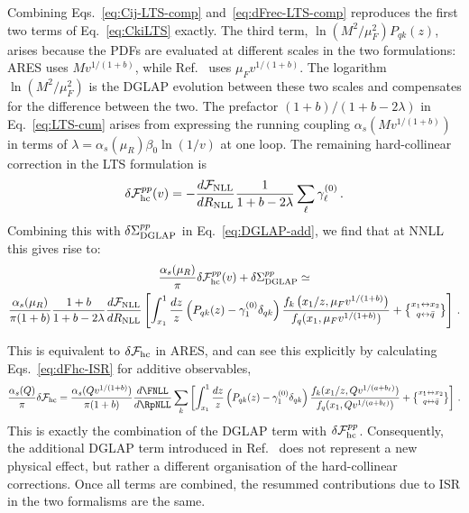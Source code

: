 Combining Eqs.~\eqref{eq:Cij-LTS-comp} and~\eqref{eq:dFrec-LTS-comp}
reproduces the first two terms of Eq.~\eqref{eq:CkiLTS} exactly. The
third term, $\ln(M^2/\mu_F^2)P_{qk}(z)$, arises because the PDFs are 
evaluated at different scales in the two formulations:
\textsc{ARES} uses $Mv^{1/(1+b)}$, while Ref.~\cite{vanBeekveld:2025zjh} uses $\mu_Fv^{1/(1+b)}$. The logarithm $\ln(M^2/\mu_F^2)$ is the 
DGLAP evolution between these two scales and compensates for the
difference between the two. The prefactor $(1+b)/(1+b-2\lambda)$ in Eq.~\eqref{eq:LTS-cum} arises from expressing the running coupling $\alpha_s(Mv^{1/(1+b)})$ in terms of $\lambda=\alpha_s(\mu_R)\beta_0\ln(1/v)$ at one loop. 
The remaining hard-collinear correction in the LTS formulation is
\begin{equation}
\label{eq:dFhc-LTS}
\delta\mathcal{F}^{pp}_{\mathrm{hc}}(v)
=-\frac{d\mathcal{F}_{\rm NLL}}{dR_{\rm NLL}}
\frac{1}{1+b-2\lambda}
\sum_{\ell}\gamma_\ell^{(0)}\,.
\end{equation}
Combining this with $\delta\Sigma^{pp}_{\rm DGLAP}$ in Eq.~\eqref{eq:DGLAP-add}, we find that at NNLL this gives rise to:
\begin{multline}
	\frac{\alpha_s(\mu_R)}{\pi}\delta\mathcal{F}^{pp}_{\mathrm{hc}}(v)+
	\delta\Sigma^{pp}_{\rm DGLAP}\simeq\\
	\frac{\alpha_s(\mu_R)}{\pi(1+b)}\frac{1+b}{1+b-2\lambda}\frac{d\mathcal{F}_{\rm NLL}}{dR_{\rm NLL}}\left[\int_{x_1}^1\frac{dz}{z}\left(P_{qk}(z)-\gamma^{(0)}_1\delta_{qk}\right)
\frac{f_k\left(x_1/z,\mu_F v^{1/(1+b)}\right)}{f_{ q}(x_{1},\mu_F v^{1/(1+b)})}
+ \left\{\substack{x_1\leftrightarrow x_2\\[0.5ex] q\leftrightarrow\bar{q}}\right\}
\right]\,.
\end{multline}

This is equivalent to $\delta\mathcal{F}_{\rm hc}$ in \textsc{ARES}, and can see this explicitly by calculating
Eqs.~\eqref{eq:dFhc-ISR} for additive observables,
\begin{equation}
	\frac{\alpha_s(Q)}{\pi}\delta\mathcal{F}_{\rm hc}=\frac{\alpha_s(Qv^{1/(1+b)})}{\pi(1+b)}\frac{d\FNLL}{d\RpNLL}\sum_k \left[\int_{x_1}^1 \frac{dz}{z} \left(P_{qk}(z)-\gamma_1^{(0)}\delta_{qk}\right) \frac{f_k(x_{1}/z,Qv^{1/(a+b_\ell)})}{f_q(x_1,Qv^{1/(a+b_\ell)})}   +\left\{\substack{x_1\leftrightarrow x_2\\[0.5ex] q\leftrightarrow\bar{q}}\right\}\right]\,.
\end{equation}
This is exactly the combination of the DGLAP term with $\delta\mathcal{F}_{\rm hc}^{pp}$. Consequently, the
additional DGLAP term introduced in
Ref.~\cite{vanBeekveld:2025zjh} does not represent a new physical effect, but rather a different organisation of the hard-collinear corrections. Once all terms are combined, the resummed contributions due to ISR in the two formalisms are the same.

